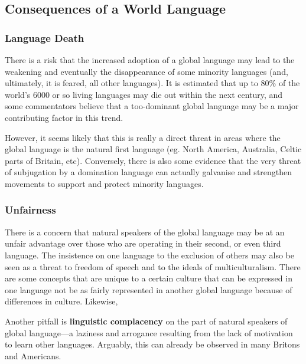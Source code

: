 \documentclass[../main.tex]{subfiles}
\begin{document}
    \subsection{Consequences of a World Language}
        \subsubsection{Language Death}
            There is a risk that the increased adoption of a global language may lead to the weakening and eventually the disappearance of some minority languages (and, ultimately, it is feared, all other languages). It is estimated that up to 80\% of the world's 6000 or so living languages may die out within the next century, and some commentators believe that a too-dominant global language may be a major contributing factor in this trend. \par
            However, it seems likely that this is really a direct threat in areas where the global language is the natural first language (eg. North America, Australia, Celtic parts of Britain, etc). Conversely, there is also some evidence that the very threat of subjugation by a domination language can actually galvanise and strengthen movements to support and protect minority languages. 

        \subsubsection{Unfairness}
            There is a concern that natural speakers of the global language may be at an unfair advantage over those who are operating in their second, or even third language. The insistence on one language to the exclusion of others may also be seen as a threat to freedom of speech and to the ideals of multiculturalism. There are some concepts that are unique to a certain culture that can be expressed in one language not be as fairly represented in another global language because of differences in culture. Likewise, \par 
            Another pitfall is \textbf{linguistic complacency} on the part of natural speakers of global language---a laziness and arrogance resulting from the lack of motivation to learn other languages. Arguably, this can already be observed in many Britons and Americans.
\end{document}
